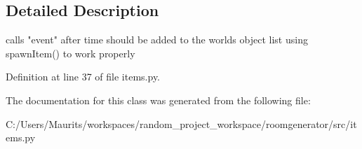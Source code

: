 \subsection{Detailed Description}
\begin{DoxyVerb}calls "event" after time
should be added to the worlds object list using spawnItem()
to work properly\end{DoxyVerb}
 

Definition at line 37 of file items.\+py.



The documentation for this class was generated from the following file\+:\begin{DoxyCompactItemize}
\item 
C\+:/\+Users/\+Maurits/workspaces/random\+\_\+project\+\_\+workspace/roomgenerator/src/items.\+py\end{DoxyCompactItemize}
